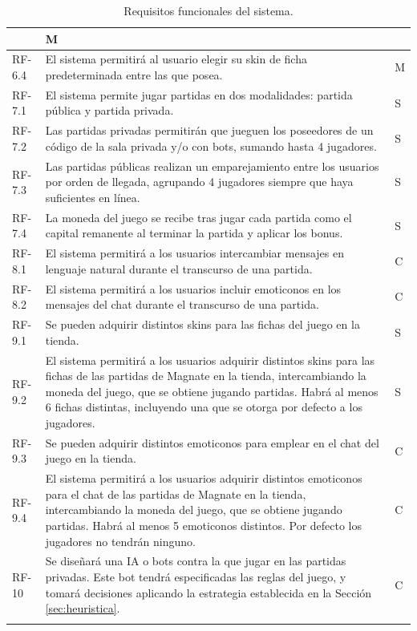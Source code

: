 \documentclass[11pt]{article}
\begin{document}
\begin{xltabular}{\textwidth}{|l|X|l|}
		& M \\
		\hline
		RF-6.4 &
		El sistema permitirá al usuario elegir su skin de ficha predeterminada entre las que posea.
		& M \\
		\hline
		RF-7.1 &
		El sistema permite jugar partidas en dos modalidades: partida pública y partida privada.
		& S \\
		\hline
		RF-7.2 &
		Las partidas privadas permitirán que jueguen los poseedores de un código de la sala privada y/o con bots, sumando hasta 4 jugadores.
		& S \\
		\hline
		RF-7.3 &
		Las partidas públicas realizan un emparejamiento entre los usuarios por orden de llegada, agrupando 4 jugadores siempre que haya suficientes en línea.
		& S \\
		\hline
		RF-7.4 &
		La moneda del juego se recibe tras jugar cada partida como el capital remanente al terminar la partida y aplicar los bonus.
		& S \\
		\hline
		RF-8.1 &
		El sistema permitirá a los usuarios intercambiar mensajes en lenguaje natural durante el transcurso de una partida.
		& C \\
		\hline
		RF-8.2 &
		El sistema permitirá a los usuarios incluir emoticonos en los mensajes del chat durante el transcurso de una partida.
		& C \\
		\hline
		RF-9.1 &
		Se pueden adquirir distintos skins para las fichas del juego en la tienda.
		& S \\
		\hline
		RF-9.2 &
		El sistema permitirá a los usuarios adquirir distintos skins para las fichas de las partidas de Magnate en la tienda, intercambiando la moneda del juego, que se obtiene jugando partidas. Habrá al menos 6 fichas distintas, incluyendo una que se otorga por defecto a los jugadores.
		& S \\
		\hline
		RF-9.3 &
		Se pueden adquirir distintos emoticonos para emplear en el chat del juego en la tienda.
		& C \\
		\hline
		RF-9.4 &
		El sistema permitirá a los usuarios adquirir distintos emoticonos para el chat de las partidas de Magnate en la tienda, intercambiando la moneda del juego, que se obtiene jugando partidas. Habrá al menos 5 emoticonos distintos. Por defecto los jugadores no tendrán ninguno.
		& C \\
		\hline
		RF-10 &
		Se diseñará una IA o bots contra la que jugar en las partidas privadas. Este bot tendrá especificadas las reglas del juego, y tomará decisiones aplicando la estrategia establecida en la Sección \ref{sec:heuristica}. 
		& C \\
		\hline

		\caption{Requisitos funcionales del sistema.}
		\label{tab:rf}
\end{xltabular}
\end{document}
